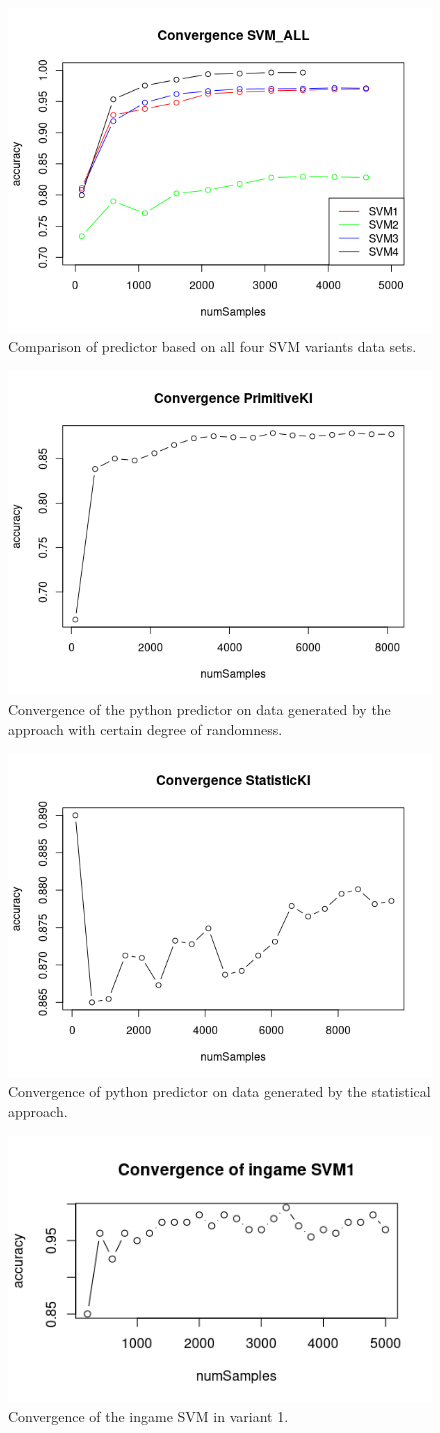 \documentclass[11pt]{article}
\begin{document}
\begin{figure}[H]
	\centering
	\includegraphics[width=.45\textwidth]{../testdata/convergence_all.png}
	\caption{Comparison of predictor based on all four SVM variants data sets.}
	\label{fig:conv_svmall}
\end{figure}
\begin{figure}[H]
	\centering
	\includegraphics[width=.45\textwidth]{../testdata/conv_prim.png}
	\caption{Convergence of the python predictor on data generated by the approach with certain degree of randomness.}
	\label{fig:conv_prim}
\end{figure}
\begin{figure}[H]
	\centering
	\includegraphics[width=.45\textwidth]{../testdata/conv_stat.png}
	\caption{Convergence of python predictor on data generated by the statistical approach.}
	\label{fig:conv_stat}
\end{figure}

\begin{figure}[H]
	\centering
	\includegraphics[width=.45\textwidth]{../testdata/conv_ingameSVM1.png}
	\caption{Convergence of the ingame SVM in variant 1.}
	\label{fig:conv_ingameSVM1}
\end{figure}
\end{document}
